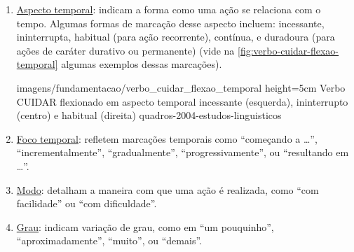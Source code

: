 \begin{enumerate}
\begin{enumerate}
        \item \underline{Aspecto temporal}: indicam a forma como uma ação se relaciona com o tempo. %
        Algumas formas de marcação desse aspecto incluem: incessante, ininterrupta, habitual (para ação recorrente), contínua, e duradoura (para ações de caráter durativo ou permanente) (vide na \autoref{fig:verbo-cuidar-flexao-temporal} algumas exemplos dessas marcações).

            {imagens/fundamentacao/verbo_cuidar_flexao_temporal} %
            {height=5cm} %
            {Verbo CUIDAR flexionado em aspecto temporal incessante (esquerda), ininterrupto (centro) e habitual (direita)} %
            {quadros-2004-estudos-linguisticos} %

        \item \underline{Foco temporal}: refletem marcações temporais como ``começando a \dots'', ``incrementalmente'', ``gradualmente'', ``progressivamente'', ou ``resultando em \dots''.
        
        \item \underline{Modo}: detalham a maneira com que uma ação é realizada, como ``com facilidade'' ou ``com dificuldade''.
        
        \item \underline{Grau}: indicam variação de grau, como em ``um pouquinho'', ``aproximadamente'', ``muito'', ou ``demais''.
    \end{enumerate}







\end{enumerate}



